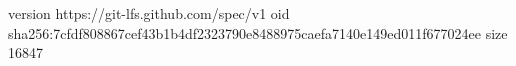 version https://git-lfs.github.com/spec/v1
oid sha256:7cfdf808867cef43b1b4df2323790e8488975caefa7140e149ed011f677024ee
size 16847
